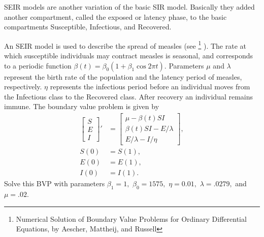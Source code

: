 \begin{problem}
SEIR models are another variation of the basic SIR model. Basically they added another compartment, called the exposed or latency phase, to the basic compartments Susceptible, Infectious, and Recovered. 

An SEIR model is used to describe the spread of measles (see \footnote{Numerical Solution of Boundary Value Problems for Ordinary Differential Equations, by Aescher, Mattheij, and Russell} ). The rate at which susceptible individuals may contract measles is seasonal, and corresponds to a periodic function $\beta(t) = \beta_0(1 + \beta_1 \cos{2\pi t})$. Parameters $\mu$ and $\lambda$ represent the birth rate of the population and the latency period of measles, respectively. $\eta$ represents the infectious period before an individual moves from the Infectious class to the Recovered class. After recovery an individual remains immune. The boundary value problem is given by
\begin{align*}
\left[\begin{array}{c}S \\ E \\ I\end{array}\right]' &= \left[\begin{array}{c}\mu - \beta(t) S I \\\beta(t) SI - E/\lambda \\E/\lambda - I/\eta\end{array}\right],\\
S(0) &= S(1),\\
E(0) &= E(1),\\
I(0) &= I(1).
\end{align*}
Solve this BVP with parameters  $\beta_1 = 1,$ $\beta_0 = 1575,$ $\eta = 0.01,$ $\lambda = .0279,$ and $\mu = .02.$ 


\end{problem}

